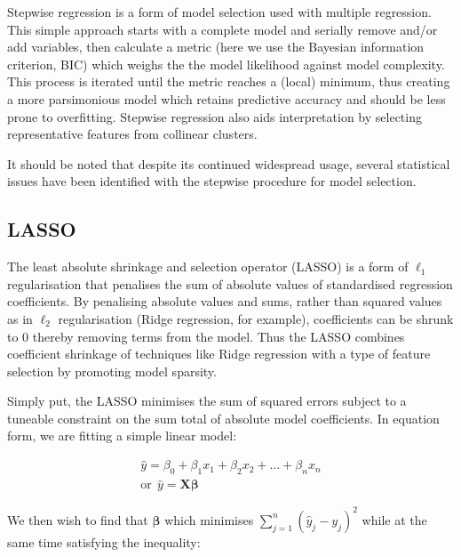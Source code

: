 \documentclass[a4paper,11pt,oneside]{book}
\begin{document}
Stepwise regression is a form of model selection used with multiple regression. This simple approach starts with a complete model and serially remove and/or add variables, then calculate a metric (here we use the Bayesian information criterion, BIC) which weighs the the model likelihood against model complexity. This process is iterated until the metric reaches a (local) minimum, thus creating a more parsimonious model which retains predictive accuracy and should be less prone to overfitting. Stepwise regression also aids interpretation by selecting representative features from collinear clusters.\cite{Mantel1970} 

It should be noted that despite its continued widespread usage, several statistical issues have been identified with the stepwise procedure for model selection.\cite{Hurvich1990, Whittingham2006}

\subsection{LASSO}\label{meth:lasso}

The least absolute shrinkage and selection operator (LASSO) is a form of $\ell_1$ regularisation that penalises the sum of absolute values of standardised regression coefficients. By penalising absolute values and sums, rather than squared values as in $\ell_2$ regularisation (Ridge regression, for example), coefficients can be shrunk to $0$ thereby removing terms from the model. Thus the LASSO combines coefficient shrinkage of techniques like Ridge regression with a type of feature selection by promoting model sparsity.\cite{Tibshirani1994, Hastie2001}

Simply put, the LASSO minimises the sum of squared errors subject to a tuneable constraint on the sum total of absolute model coefficients. In equation form, we are fitting a simple linear model:

\begin{equation}
\begin{aligned}
\hat{y} = \beta_0 + \beta_1 x_1 + \beta_2 x_2 + \ldots + \beta_n x_n\\
\mathrm{or}~~\hat{y} = \bm{X}\bm{\beta} %
\end{aligned}
\end{equation} \vspace{.2em}

We then wish to find that $\bm{\beta}$ which minimises $\sum_{j=1}^{n}(\hat{y}_j - y_j)^2$ while at the same time satisfying the inequality:
\end{document}
